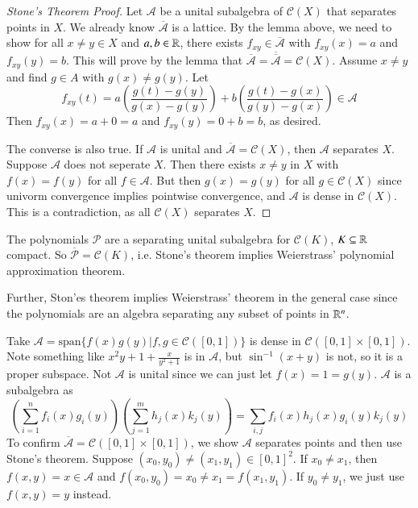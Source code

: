\begin{proof}[Stone's Theorem Proof]
    Let $\mathcal{A}$ be a unital subalgebra of $\mathcal{C}(X)$ that separates points in $X$. We already know $\overline{\mathcal{A}}$ is a lattice. By the lemma above, we need to show for all $x \neq y \in X$ and $a,b \in \mathbb R$, there exists $f_{xy} \in \overline{\mathcal{A}}$ with $f_{xy}(x) = a$ and $f_{xy}(y) = b$. This will prove by the lemma that $\overline{\mathcal{A}} = \overline{\overline{\mathcal{A}}} = \mathcal{C}(X)$. Assume $x \neq y$ and find $g \in A$ with $g(x) \neq g(y)$. Let $$f_{xy}(t) = a\left(\frac{g(t) - g(y)}{g(x) - g(y)}\right) + b \left(\frac{g(t) - g(x)}{g(y) - g(x)}\right) \in \mathcal{A}$$ Then $f_{xy}(x) = a+0 = a$ and $f_{xy}(y) = 0+b= b$, as desired.

    The converse is also true. If $\mathcal{A}$ is unital and $\overline{\mathcal{A}} = \mathcal{C}(X)$, then $\mathcal{A}$ separates $X$. Suppose $\mathcal{A}$ does not seperate $X$. Then there exists $x \neq y$ in $X$ with $f(x) = f(y)$ for all $f \in \mathcal{A}$. But then $g(x) = g(y)$ for all $g \in \mathcal{C}(X)$ since univorm convergence implies pointwise convergence, and $\mathcal{A}$ is dense in $\mathcal{C}(X)$. This is a contradiction, as all $\mathcal{C}(X)$ separates $X$.
\end{proof}

\begin{example}
    The polynomials $\mathcal{P}$ are a separating unital subalgebra for $\mathcal{C}(K)$, $K \subseteq \mathbb R$ compact. So $\overline{\mathcal{P}} = \mathcal{C}(K)$, i.e. Stone's theorem implies Weierstrass' polynomial approximation theorem.
\end{example}

Further, Ston'es theorem implies Weierstrass' theorem in the general case since the polynomials are an algebra separating any subset of points in $\mathbb R^n$.

\begin{example}
    Take $\mathcal{A} = \text{span}\{f(x)g(y)\vert f,g \in \mathcal{C}([0,1])\}$ is dense in $\mathcal{C}([0,1]\times[0,1])$. Note something like $x^2y + 1 + \frac{x}{y^2+1}$ is in $\mathcal{A}$, but $\sin^{-1}(x+y)$ is not, so it is a proper subspace. Not $\mathcal{A}$ is unital since we can just let $f(x) = 1 = g(y)$. $\mathcal{A}$ is a subalgebra as \begin{equation*}
        \left(\sum_{i=1}^nf_i(x)g_i(y)\right)\left(\sum_{j=1}^mh_j(x)k_j(y)\right) = \sum_{i,j}f_i(x)h_j(x)g_i(y)k_j(y)
    \end{equation*}
    To confirm $\overline{\mathcal{A}} = \mathcal{C}([0,1]\times [0,1])$, we show $\mathcal{A}$ separates points and then use Stone's theorem. Suppose $(x_0,y_0) \neq (x_1,y_1) \in [0,1]^2$. If $x_0 \neq x_1$, then $f(x,y) = x \in \mathcal{A}$ and $f(x_0,y_0) = x_0 \neq x_1 = f(x_1,y_1)$. If $y_0 \neq y_1$, we just use $f(x,y) = y$ instead.
\end{example}

